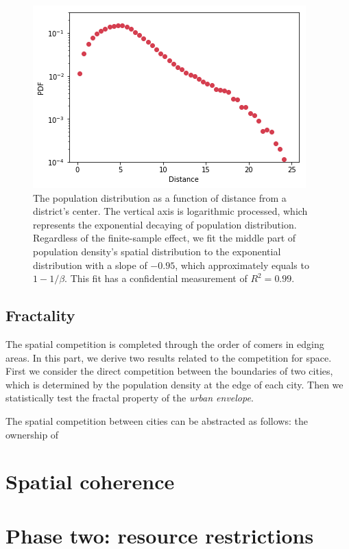 \documentclass[aps,prl]{revtex4-2}
\begin{document}
\begin{figure}[ht]
\centering
\includegraphics[width=0.9\linewidth]{fig/clark.png}
\caption{The population distribution as a function of distance from a district's center. The vertical axis is logarithmic processed, which represents the exponential decaying of population distribution. Regardless of the finite-sample effect, we fit the middle part of population density's spatial distribution to the exponential distribution with a slope of $-0.95$, which approximately equals to $1-1/\beta.$ This fit has a confidential measurement of $R^2=0.99$.}
\label{fig:clark}
\end{figure}

\subsection{Fractality}

The spatial competition is completed through the order of comers in edging areas. In this part, we derive two results related to the competition for space. First we consider the direct competition between the boundaries of two cities, which is determined by the population density at the edge of each city. Then we statistically test the fractal property of the \emph{urban envelope}. 

The spatial competition between cities can be abstracted as follows: the ownership of 

\section{Spatial coherence}

\section{Phase two: resource restrictions}
\end{document}
